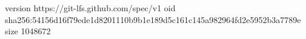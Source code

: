 version https://git-lfs.github.com/spec/v1
oid sha256:54156d16f79ede1d8201110b9b1e189d5c161c145a982964fd2e5952b3a7789e
size 1048672
